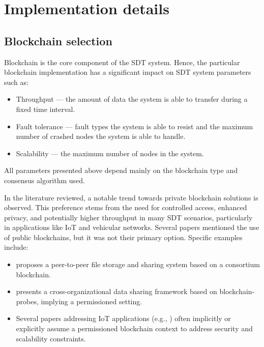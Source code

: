 \documentclass[10pt]{llncs}
\begin{document}
\section{Implementation details} \label{implementation_details}

\subsection{Blockchain selection}

Blockchain is the core component of the SDT system.
Hence, the particular blockchain implementation has a significant impact on SDT system parameters such as:

\begin{itemize}
    \item Throughput --- the amount of data the system is able to transfer during a fixed time interval.
    \item Fault tolerance --- fault types the system is able to resist and the maximum number of crashed nodes the system is able to handle.
    \item Scalability --- the maximum number of nodes in the system.
\end{itemize}

All parameters presented above depend mainly on the blockchain type and consensus algorithm used.

In the literature reviewed, a notable trend towards private blockchain solutions is observed.
This preference stems from the need for controlled access, enhanced privacy, and potentially higher throughput in many SDT scenarios, particularly in applications like IoT and vehicular networks. 
Several papers mentioned the use of public blockchains, but it was not their primary option. 
Specific examples include:

\begin{itemize}
    \item \cite{Peng2023} proposes a peer-to-peer file storage and sharing system based on a consortium blockchain.
    \item \cite{Jia2023} presents a cross-organizational data sharing framework based on blockchain-probes, implying a permissioned setting.
    \item Several papers addressing IoT applications (e.g., \cite{Ai2022,Gupta2022}) often implicitly or explicitly assume a permissioned blockchain context to address security and scalability constraints.
\end{itemize}
\end{document}
